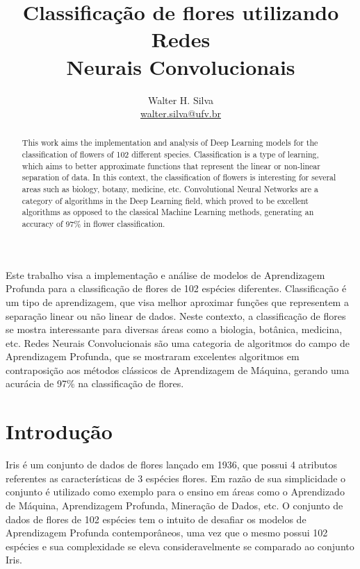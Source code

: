 \documentclass[12pt]{article}
\title{Classificação de flores utilizando Redes\\ Neurais Convolucionais}
\author{Walter H. Silva\\\href{walter.silva@ufv.br}{walter.silva@ufv.br}}
\newcommand\tab[1][1cm]{\hspace*{#1}}
\begin{document}
 

\maketitle

\begin{abstract} 
  This work aims the implementation and analysis of Deep Learning models for the classification of flowers of 102 different species. Classification is a type of learning, which aims to better approximate functions that represent the linear or non-linear separation of data. In this context, the classification of flowers is interesting for several areas such as biology, botany, medicine, etc. Convolutional Neural Networks are a category of algorithms in the Deep Learning field, which proved to be excellent algorithms as opposed to the classical Machine Learning methods, generating an accuracy of 97\% in flower classification.
\end{abstract}

\begin{resumo} 
  Este trabalho visa a implementação e análise de modelos de Aprendizagem Profunda para a classificação de flores de 102 espécies diferentes. Classificação é um tipo de aprendizagem, que visa melhor aproximar funções que representem a separação linear ou não linear de dados. Neste contexto, a classificação de flores se mostra interessante para diversas áreas como a biologia, botânica, medicina, etc. Redes Neurais Convolucionais são uma categoria de algoritmos do campo de Aprendizagem Profunda, que se mostraram excelentes algoritmos em contraposição aos métodos clássicos de Aprendizagem de Máquina, gerando uma acurácia de 97\% na classificação de flores.
\end{resumo}

\section{Introdução}

\tab\tab[0.5pt] Iris \cite{Iris} é um conjunto de dados de flores lançado em 1936, que possui 4 atributos referentes as características de 3 espécies flores. Em razão de sua simplicidade o conjunto é utilizado como exemplo para o ensino em áreas como o Aprendizado de Máquina, Aprendizagem Profunda, Mineração de Dados, etc. O conjunto de dados de flores de 102 espécies \cite{Flower} tem o intuito de desafiar os modelos de Aprendizagem Profunda contemporâneos, uma vez que o mesmo possui 102 espécies e sua complexidade se eleva consideravelmente se comparado ao conjunto Iris.
	
\end{document}
